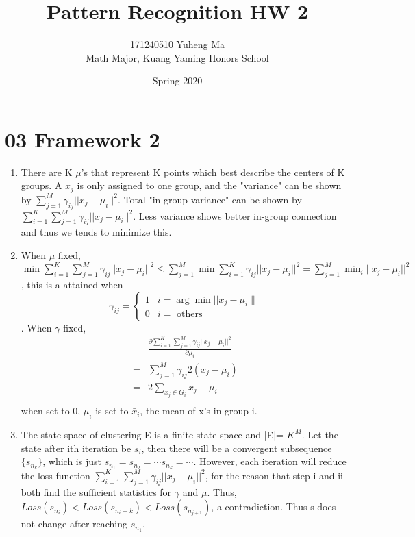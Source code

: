 \documentclass[10pt, oneside]{article}
\title{
Pattern Recognition HW 2
}
\author{171240510 Yuheng Ma\\[0.3cm]{Math Major, Kuang Yaming Honors School}}
\date{Spring 2020}
\begin{document}
\maketitle

\vspace{.25in}
\section{03 Framework 2}
\begin{enumerate}
	\item There are K $\mu$'s that represent K points which best describe the centers of K groups. A $x_j$ is only assigned to one group, and the "variance" can be shown by $\sum_{j=1}^{M}\gamma_{ij}||x_j-\mu_i||^2$. Total "in-group variance" can be shown by $\sum_{i=1}^{K}\sum_{j=1}^{M}\gamma_{ij}||x_j-\mu_i||^2$. Less variance shows better in-group connection and thus we tends to minimize this.
	\item When $\mu$ fixed, $\min \sum_{i=1}^{K}\sum_{j=1}^{M}\gamma_{ij}||x_j-\mu_i||^2\leq \sum_{j=1}^{M}\min\sum_{i=1}^{K}\gamma_{ij}||x_j-\mu_i||^2=\sum_{j=1}^{M}\min_{i}||x_j-\mu_i||^2$, this is a attained when 
	$$
	\gamma_{i j}=\left\{\begin{array}{ll}
	1 & i=\arg \min || x_{j}-\mu_{i} \| \\
	0 & i=\text { others }
	\end{array}\right.
	$$
	. When $\gamma$ fixed, 
	$$
	\begin{aligned}
	&\frac{\partial \sum_{i=1}^{K}\sum_{j=1}^{M}\gamma_{ij}||x_j-\mu_i||^2}{\partial \mu_i}\\
	=&\sum_{j=1}^{M} \gamma_{ij} 2(x_j-\mu_i)\\
	=&2\sum_{x_j\in G_i} x_j-\mu_i\\
	\end{aligned}
$$
when set to 0, $\mu_i$ is set to $\bar{x}_i$, the mean of x's in group i. 
\item The state space of clustering E is a finite state space and |E|= $K^M$. Let the state after ith iteration be $s_i$, then there will be a convergent subsequence $\{s_{n_k}\}$, which is just $s_{n_1}=s_{n_2}=\cdots s_{n_k}=\cdots$. However, each iteration will reduce the loss function $\sum_{i=1}^{K}\sum_{j=1}^{M}\gamma_{ij}||x_j-\mu_i||^2$, for the reason that step i and ii both find the sufficient statistics for $\gamma$ and $\mu$. Thus, $Loss(s_{n_i})<Loss(s_{n_i+k})<Loss(s_{n_{j+1}})$, a contradiction. Thus s does not change after reaching $s_{n_1}$.
\end{enumerate}
\end{document}
